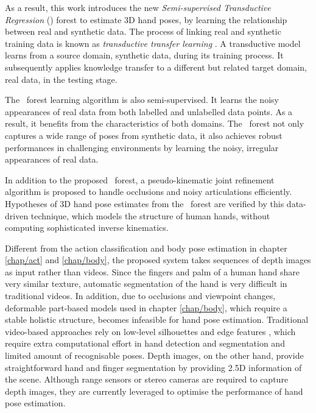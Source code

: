 As a result, this work introduces the new \emph{Semi-supervised Transductive Regression} (\STR) forest to estimate 3D hand poses, by learning the relationship between real and synthetic data. 
The process of linking real and synthetic training data is known as \emph{transductive transfer learning} \cite{Pan2010}.  
A transductive model learns from a source domain, \eg synthetic data, during its training process.
It subsequently applies knowledge transfer to a different but related target domain, \eg real data, in the testing stage. 

The \STR\ forest learning algorithm is also semi-supervised. 
It learns the noisy appearances of real data from both labelled and unlabelled data points. 
As a result, it benefits from the characteristics of both domains. 
The \STR\ forest not only captures a wide range of poses from synthetic data, it also achieves robust performances in challenging environments by learning the noisy, irregular appearances of real data. 

In addition to the proposed \STR\ forest, a pseudo-kinematic joint refinement algorithm is proposed to handle occlusions and noisy articulations efficiently. 
Hypotheses of 3D hand pose estimates from the \STR\ forest are verified by this data-driven technique, which models the structure of human hands, without computing sophisticated inverse kinematics. 

Different from the action classification and body pose estimation in chapter \ref{chap/act} and \ref{chap/body}, the proposed system takes sequences of depth images as input rather than videos. 
Since the fingers and palm of a human hand share very similar texture, automatic segmentation of the hand is very difficult in traditional videos. 
In addition, due to occlusions and viewpoint changes, deformable part-based models used in chapter \ref{chap/body}, which require a stable holistic structure, becomes infeasible for hand pose estimation.   
Traditional video-based approaches rely on low-level silhouettes and edge features \cite{Rosales2001, Chua2002, Athitsos2003, Stenger2006}, which require extra computational effort in hand detection and segmentation and limited amount of recognisable poses.   
Depth images, on the other hand, provide straightforward hand and finger segmentation by providing 2.5D information of the scene. 
Although range sensors or stereo cameras are required to capture depth images, they are currently leveraged to optimise the performance of hand pose estimation. 

